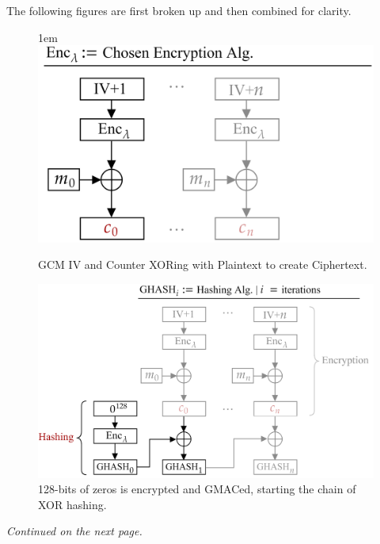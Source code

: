 \newpage

\noindent
The following figures are first broken up and then combined for clarity.\\

\begin{figure}[h!]
    \centering
    \hfill{1em}
    \includegraphics[width=.8\textwidth]{Sections/sec/enc/iv.png}
    \caption{GCM IV and Counter XORing with Plaintext to create Ciphertext.}
    \label{fig:block_cipher}
\end{figure}

\begin{figure}[h!]
    \centering
    \includegraphics[width=.9\textwidth]{Sections/sec/enc/ghash.png}
    \caption{128-bits of zeros is encrypted and GMACed, starting the chain of XOR hashing.}
    \label{fig:block_cipher}
\end{figure}
\vfill
\begin{center}
    \textit{Continued on the next page.}
\end{center}
\vfill 
\newpage 


